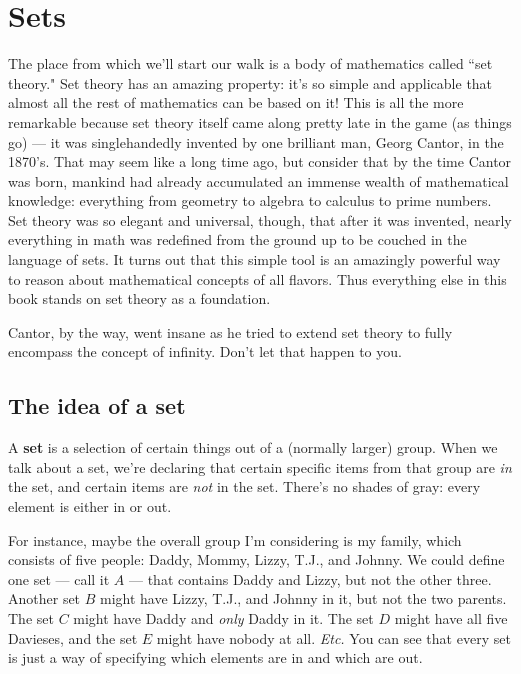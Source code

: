 
\chapter{Sets}
\label{chap:sets}

The place from which we'll start our walk is a body of mathematics called
``set theory." Set theory has an amazing property: it's so simple and
applicable that almost all the rest of mathematics can be based on it! This
is all the more remarkable because set theory itself came along pretty late
in the game (as things go) --- it was singlehandedly invented by one
brilliant man, Georg Cantor, in the 1870's. That may seem like a long time
ago, but consider that by the time Cantor was born, mankind had already
accumulated an immense wealth of mathematical knowledge: everything from
geometry to algebra to calculus to prime numbers. Set theory was so elegant
and universal, though, that after it was invented, nearly everything in
math was redefined from the ground up to be couched in the language of
sets. It turns out that this simple tool is an amazingly powerful way to
reason about mathematical concepts of all flavors. Thus everything else in
this book stands on set theory as a foundation.

Cantor, by the way, went insane as he tried to extend set theory to fully
encompass the concept of infinity. Don't let that happen to you.



\section{The idea of a set}

A \textbf{set}  is a selection of certain things out of a
(normally larger) group.  When we talk about a set, we're declaring that
certain specific items from that group are \textit{in} the set, and certain
items are \textit{not} in the set. There's no shades of gray: every element
is either in or out. 

For instance, maybe the overall group I'm considering is my family, which
consists of five people: Daddy, Mommy, Lizzy, T.J., and Johnny. We could
define one set --- call it $A$ --- that contains Daddy and Lizzy, but not
the other three. Another set $B$ might have Lizzy, T.J., and Johnny in it,
but not the two parents. The set $C$ might have Daddy and \textit{only}
Daddy in it.  The set $D$ might have all five Davieses,  and the set $E$
might have nobody at all. \textit{Etc.} You can see that every set is just
a way of specifying which elements are in and which are out.

